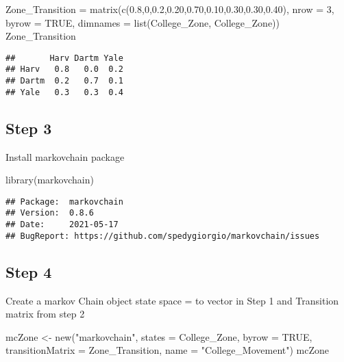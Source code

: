 \documentclass[
]{article}
\newenvironment{Shaded}{\begin{snugshade}}{\end{snugshade}}
\newcommand{\AttributeTok}[1]{\textcolor[rgb]{0.77,0.63,0.00}{#1}}
\newcommand{\ConstantTok}[1]{\textcolor[rgb]{0.00,0.00,0.00}{#1}}
\newcommand{\DecValTok}[1]{\textcolor[rgb]{0.00,0.00,0.81}{#1}}
\newcommand{\FloatTok}[1]{\textcolor[rgb]{0.00,0.00,0.81}{#1}}
\newcommand{\FunctionTok}[1]{\textcolor[rgb]{0.00,0.00,0.00}{#1}}
\newcommand{\NormalTok}[1]{#1}
\newcommand{\OtherTok}[1]{\textcolor[rgb]{0.56,0.35,0.01}{#1}}
\newcommand{\StringTok}[1]{\textcolor[rgb]{0.31,0.60,0.02}{#1}}
\begin{document}
\begin{Shaded}
\begin{Highlighting}[]
\NormalTok{Zone\_Transition }\OtherTok{=} \FunctionTok{matrix}\NormalTok{(}\FunctionTok{c}\NormalTok{(}\FloatTok{0.8}\NormalTok{,}\DecValTok{0}\NormalTok{,}\FloatTok{0.2}\NormalTok{,}\FloatTok{0.20}\NormalTok{,}\FloatTok{0.70}\NormalTok{,}\FloatTok{0.10}\NormalTok{,}\FloatTok{0.30}\NormalTok{,}\FloatTok{0.30}\NormalTok{,}\FloatTok{0.40}\NormalTok{), }
                         \AttributeTok{nrow =} \DecValTok{3}\NormalTok{,}
                         \AttributeTok{byrow =} \ConstantTok{TRUE}\NormalTok{,}
                         \AttributeTok{dimnames =} \FunctionTok{list}\NormalTok{(College\_Zone, College\_Zone))}
\NormalTok{Zone\_Transition}
\end{Highlighting}
\end{Shaded}

\begin{verbatim}
##       Harv Dartm Yale
## Harv   0.8   0.0  0.2
## Dartm  0.2   0.7  0.1
## Yale   0.3   0.3  0.4
\end{verbatim}

\hypertarget{step-3}{%
\subsection{Step 3}\label{step-3}}

Install markovchain package

\begin{Shaded}
\begin{Highlighting}[]
\FunctionTok{library}\NormalTok{(markovchain)}
\end{Highlighting}
\end{Shaded}

\begin{verbatim}
## Package:  markovchain
## Version:  0.8.6
## Date:     2021-05-17
## BugReport: https://github.com/spedygiorgio/markovchain/issues
\end{verbatim}

\hypertarget{step-4}{%
\subsection{Step 4}\label{step-4}}

Create a markov Chain object state space = to vector in Step 1 and
Transition matrix from step 2

\begin{Shaded}
\begin{Highlighting}[]
\NormalTok{mcZone }\OtherTok{\textless{}{-}} \FunctionTok{new}\NormalTok{(}\StringTok{"markovchain"}\NormalTok{, }\AttributeTok{states =}\NormalTok{ College\_Zone,}
               \AttributeTok{byrow =} \ConstantTok{TRUE}\NormalTok{,}
               \AttributeTok{transitionMatrix =}\NormalTok{ Zone\_Transition,}
               \AttributeTok{name =} \StringTok{"College\_Movement"}\NormalTok{)}
\NormalTok{mcZone}
\end{Highlighting}
\end{Shaded}
\end{document}
